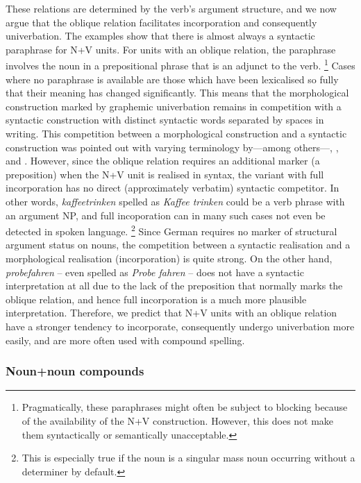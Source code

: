\documentclass[biblatex, charis, linguex]{glossa}\usepackage{knitr}
\begin{document}
These relations are determined by the verb's argument structure, and we now argue that the oblique relation facilitates incorporation and consequently univerbation.
The examples show that there is almost always a syntactic paraphrase for N+V units.
For units with an oblique relation, the paraphrase involves the noun in a prepositional phrase that is an adjunct to the verb.%
\footnote{Pragmatically, these paraphrases might often be subject to blocking because of the availability of the N+V construction.
However, this does not make them syntactically or semantically unacceptable.}
Cases where no paraphrase is available are those which have been lexicalised so fully that their meaning has changed significantly.
This means that the morphological construction marked by graphemic univerbation remains in competition with a syntactic construction with distinct syntactic words separated by spaces in writing.
This competition between a morphological construction and a syntactic construction was pointed out with varying terminology by---among others---\citet[12]{FleischerBartz2012}, \citet[13]{Schluecker2012}, and \citet[88]{Morcinek2013}.
However, since the oblique relation requires an additional marker (a preposition) when the N+V unit is realised in syntax, the variant with full incorporation has no direct (approximately verbatim) syntactic competitor.
In other words, \textit{kaffeetrinken} spelled as \textit{Kaffee trinken} could be a verb phrase with an argument NP, and full incoporation can in many such cases not even be detected in spoken language.%
\footnote{This is especially true if the noun is a singular mass noun occurring without a determiner by default.}
Since German requires no marker of structural argument status on nouns, the competition between a syntactic realisation and a morphological realisation (incorporation) is quite strong.
On the other hand, \textit{probefahren} -- even spelled as \textit{Probe fahren} -- does not have a syntactic interpretation at all due to the lack of the preposition that normally marks the oblique relation, and hence full incorporation is a much more plausible interpretation.
Therefore, we predict that N+V units with an oblique relation have a stronger tendency to incorporate, consequently undergo univerbation more easily, and are more often used with compound spelling.

\subsubsection{Noun+noun compounds}
\label{sub:nncompounds}
\label{sub:nvunitsasreluctantcompounds}
\end{document}
